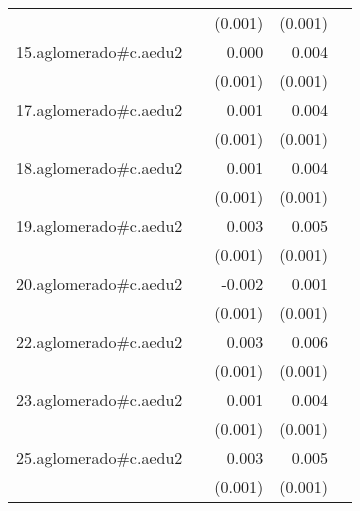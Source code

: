 {\begin{longtable}{l*{4}{D{.}{.}{-1}}}
            &                     &     (0.001)         &     (0.001)         &                     \\
\addlinespace
15.aglomerado#c.aedu2&                     &       0.000         &       0.004\sym{***}&                     \\
            &                     &     (0.001)         &     (0.001)         &                     \\
\addlinespace
17.aglomerado#c.aedu2&                     &       0.001         &       0.004\sym{***}&                     \\
            &                     &     (0.001)         &     (0.001)         &                     \\
\addlinespace
18.aglomerado#c.aedu2&                     &       0.001         &       0.004\sym{***}&                     \\
            &                     &     (0.001)         &     (0.001)         &                     \\
\addlinespace
19.aglomerado#c.aedu2&                     &       0.003\sym{*}  &       0.005\sym{***}&                     \\
            &                     &     (0.001)         &     (0.001)         &                     \\
\addlinespace
20.aglomerado#c.aedu2&                     &      -0.002         &       0.001         &                     \\
            &                     &     (0.001)         &     (0.001)         &                     \\
\addlinespace
22.aglomerado#c.aedu2&                     &       0.003\sym{*}  &       0.006\sym{***}&                     \\
            &                     &     (0.001)         &     (0.001)         &                     \\
\addlinespace
23.aglomerado#c.aedu2&                     &       0.001         &       0.004\sym{***}&                     \\
            &                     &     (0.001)         &     (0.001)         &                     \\
\addlinespace
25.aglomerado#c.aedu2&                     &       0.003         &       0.005\sym{***}&                     \\
            &                     &     (0.001)         &     (0.001)         &                     \\

\end{longtable}}
